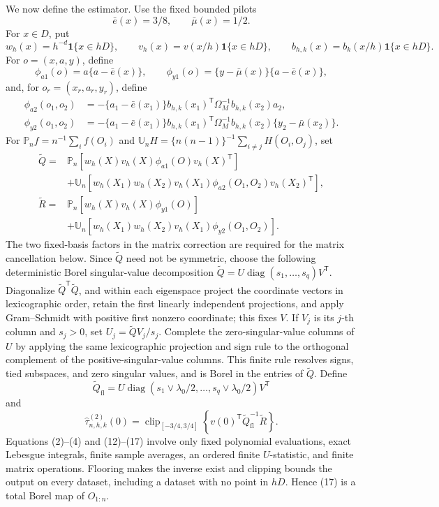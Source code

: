 We now define the estimator.  Use the fixed bounded pilots
\[
 \bar e(x)=3/8,
 \qquad \bar\mu(x)=1/2.
 \tag{12}
\]
For \(x\in D\), put
\[
 w_h(x)=h^{-d}\mathbf1\{x\in hD\},\qquad
 v_h(x)=v(x/h)\mathbf1\{x\in hD\},\qquad
 b_{h,k}(x)=b_k(x/h)\mathbf1\{x\in hD\}.
\]
For \(o=(x,a,y)\), define
\[
 \phi_{a1}(o)=a\{a-\bar e(x)\},
 \qquad
 \phi_{y1}(o)=\{y-\bar\mu(x)\}\{a-\bar e(x)\},
 \tag{13}
\]
and, for \(o_r=(x_r,a_r,y_r)\), define
\[
 \begin{split}
 \phi_{a2}(o_1,o_2)
 &=-\{a_1-\bar e(x_1)\}
 b_{h,k}(x_1)^{\mathsf T}\Omega_M^{-1}b_{h,k}(x_2)a_2,\\
 \phi_{y2}(o_1,o_2)
 &=-\{a_1-\bar e(x_1)\}
 b_{h,k}(x_1)^{\mathsf T}\Omega_M^{-1}b_{h,k}(x_2)
 \{y_2-\bar\mu(x_2)\}.
 \end{split}
 \tag{14}
\]
For \(\mathbb P_nf=n^{-1}\sum_i f(O_i)\) and \(\mathbb U_nH=\{n(n-1)\}^{-1}\sum_{i\ne j}H(O_i,O_j)\), set
\[
 \begin{split}
 \widetilde Q={}&\mathbb P_n\!\left[
 w_h(X)v_h(X)\phi_{a1}(O)v_h(X)^{\mathsf T}\right]\\
 &+\mathbb U_n\!\left[
 w_h(X_1)w_h(X_2)v_h(X_1)\phi_{a2}(O_1,O_2)v_h(X_2)^{\mathsf T}\right],\\
 \widetilde R={}&\mathbb P_n\!\left[
 w_h(X)v_h(X)\phi_{y1}(O)\right]\\
 &+\mathbb U_n\!\left[
 w_h(X_1)w_h(X_2)v_h(X_1)\phi_{y2}(O_1,O_2)\right].
 \end{split}
 \tag{15}
\]
The two fixed-basis factors in the matrix correction are required for the matrix cancellation below.  Since \(\widetilde Q\) need not be symmetric, choose the following deterministic Borel singular-value decomposition \(\widetilde Q=U\operatorname{diag}(s_1,\ldots,s_q)V^{\mathsf T}\).  Diagonalize \(\widetilde Q^{\mathsf T}\widetilde Q\), and within each eigenspace project the coordinate vectors in lexicographic order, retain the first linearly independent projections, and apply Gram--Schmidt with positive first nonzero coordinate; this fixes \(V\).  If \(V_j\) is its \(j\)-th column and \(s_j>0\), set \(U_j=\widetilde QV_j/s_j\).  Complete the zero-singular-value columns of \(U\) by applying the same lexicographic projection and sign rule to the orthogonal complement of the positive-singular-value columns.  This finite rule resolves signs, tied subspaces, and zero singular values, and is Borel in the entries of \(\widetilde Q\).  Define
\[
 \widetilde Q_{\mathrm{fl}}
 =U\operatorname{diag}(s_1\vee\lambda_0/2,\ldots,s_q\vee\lambda_0/2)V^{\mathsf T}
 \tag{16}
\]
and
\[
 \widehat\tau^{(2)}_{n,h,k}(0)
 =\operatorname{clip}_{[-3/4,3/4]}
 \left\{v(0)^{\mathsf T}\widetilde Q_{\mathrm{fl}}^{-1}\widetilde R\right\}.
 \tag{17}
\]
Equations (2)--(4) and (12)--(17) involve only fixed polynomial evaluations, exact Lebesgue integrals, finite sample averages, an ordered finite \(U\)-statistic, and finite matrix operations.  Flooring makes the inverse exist and clipping bounds the output on every dataset, including a dataset with no point in \(hD\).  Hence (17) is a total Borel map of \(O_{1:n}\).

